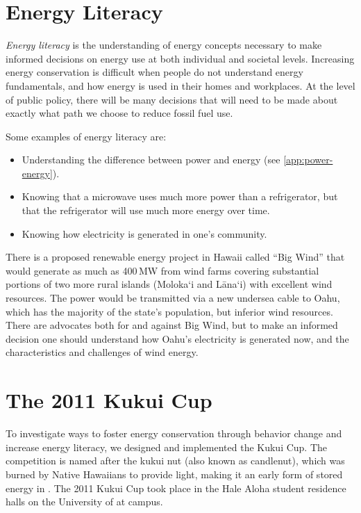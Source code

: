 \section{Energy Literacy}

\emph{Energy literacy} is the understanding of energy concepts necessary to make informed decisions on energy use at both individual and societal levels. Increasing energy conservation is difficult when people do not understand energy fundamentals, and how energy is used in their homes and workplaces. At the level of public policy, there will be many decisions that will need to be made about exactly what path we choose to reduce fossil fuel use.

Some examples of energy literacy are:

\begin{itemize}
	\item Understanding the difference between power and energy (see \autoref{app:power-energy}).
	\item Knowing that a microwave uses much more power than a refrigerator, but that the refrigerator will use much more energy over time.
	\item Knowing how electricity is generated in one's community.
\end{itemize}

There is a proposed renewable energy project in Hawaii called ``Big Wind'' that would generate as much as 400\,MW from wind farms covering substantial portions of two more rural islands (Moloka`i and L\=ana`i) with excellent wind resources. The power would be transmitted via a new undersea cable to Oahu, which has the majority of the state's population, but inferior wind resources. There are advocates both for and against Big Wind, but to make an informed decision one should understand how Oahu's electricity is generated now, and the characteristics and challenges of wind energy.


\section{The 2011 Kukui Cup}

To investigate ways to foster energy conservation through behavior change and increase energy literacy, we designed and implemented the Kukui Cup. The competition is named after the kukui nut (also known as candlenut), which was burned by Native Hawaiians to provide light, making it an early form of stored energy in \Hawaii. The 2011 Kukui Cup took place in the Hale Aloha student residence halls on the University of \Hawaii at \Manoa campus.

